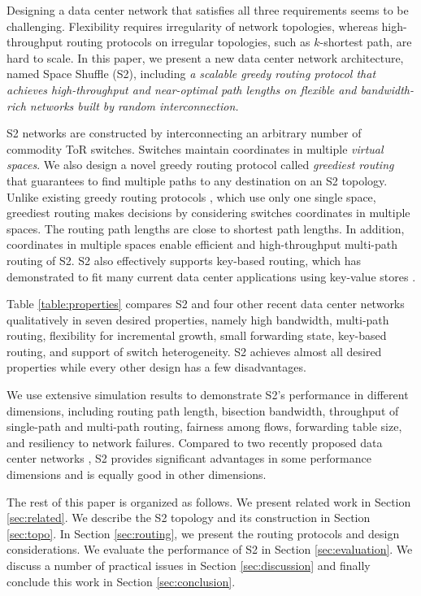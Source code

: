 \documentclass[10pt,conference]{IEEEtran}
\begin{document}
Designing a data center network that satisfies all three requirements seems to be challenging. Flexibility requires irregularity of network topologies, whereas high-throughput routing protocols on irregular topologies, such as $k$-shortest path, are hard to scale.
In this paper, we present a new data center network architecture, named Space Shuffle (S2), including \emph{a scalable greedy routing protocol that achieves high-throughput and near-optimal path lengths on flexible and bandwidth-rich networks built by random interconnection.}

S2 networks are constructed by interconnecting an arbitrary number of commodity ToR switches.
Switches maintain coordinates in multiple \emph{virtual spaces}.
We also design a novel greedy routing protocol called \emph{greediest routing} that guarantees to find multiple paths to any destination on an S2 topology.
Unlike existing greedy routing protocols \cite{GDV,MDT-ToN}, which use only one single space, greediest routing makes decisions by considering switches coordinates in multiple spaces.
The routing path lengths are close to shortest path lengths.
In addition, coordinates in multiple spaces enable efficient and high-throughput multi-path routing of S2.
S2 also effectively supports key-based routing, which has demonstrated to fit many current data center applications using key-value stores \cite{Symbiotic}.


Table \ref{table:properties} compares S2 and four other recent data center networks qualitatively in seven desired properties, namely high bandwidth, multi-path routing, flexibility for incremental growth, small forwarding state, 
 key-based routing, and support of switch  heterogeneity.
S2 achieves almost all desired properties while every other design has a few disadvantages.

We  use extensive simulation results to demonstrate S2's performance in different dimensions, including routing path length, bisection bandwidth, throughput of single-path and multi-path routing, fairness among flows, forwarding table size, and resiliency to network failures.
Compared to two recently proposed data center networks \cite{SWDC} \cite{Jellyfish}, S2 provides significant advantages in some performance dimensions and is equally good in other dimensions.


The rest of this paper is organized as follows.
We present related work in Section \ref{sec:related}.
We describe the S2 topology and its construction in Section \ref{sec:topo}.
In Section \ref{sec:routing}, we present the routing protocols and design considerations.
We evaluate the performance of S2 in Section \ref{sec:evaluation}.
We discuss a number of practical issues in Section \ref{sec:discussion} and finally conclude this work in Section \ref{sec:conclusion}.
\end{document}
